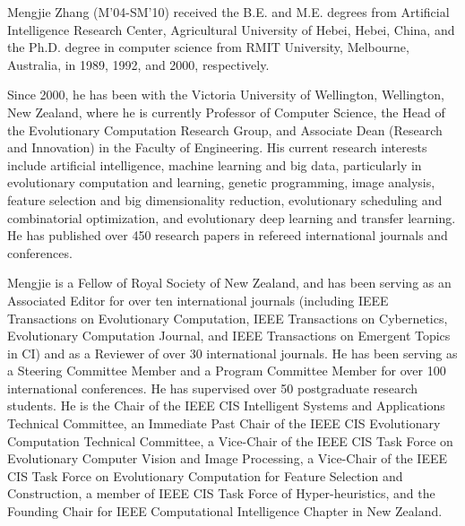 \documentclass[10pt,journal,compsoc]{IEEEtran}
\begin{document}
\vspace{-9.5 mm}
\begin{IEEEbiography}{Mengjie Zhang} (M’04-SM’10)
received the B.E. and M.E. degrees from Artificial Intelligence Research Center, Agricultural University of Hebei, Hebei, China, and the Ph.D. degree in computer science from RMIT University, Melbourne, Australia, in 1989, 1992, and 2000, respectively.

Since 2000, he has been with the Victoria University of Wellington, Wellington, New Zealand, where he is currently Professor of Computer Science, the Head of the Evolutionary Computation Research Group, and Associate Dean (Research and Innovation) in the Faculty of Engineering. His current research interests include artificial intelligence, machine learning and big data, particularly in evolutionary computation and learning, genetic programming, image analysis, feature selection and big dimensionality reduction, evolutionary scheduling and combinatorial optimization, and evolutionary deep learning and transfer learning. He has published over 450 research papers in refereed international journals and conferences.

Mengjie is a Fellow of Royal Society of New Zealand, and has been serving as an Associated Editor for over ten international journals (including IEEE Transactions on Evolutionary Computation, IEEE Transactions on Cybernetics, Evolutionary Computation Journal, and IEEE Transactions on Emergent Topics in CI) and as a Reviewer of over 30 international journals. He has been serving as a Steering Committee Member and a Program Committee Member for over 100 international conferences. He has supervised over 50  postgraduate research students. He is the Chair of the IEEE CIS Intelligent Systems and Applications Technical Committee, an Immediate Past Chair of the IEEE CIS Evolutionary Computation Technical Committee, a Vice-Chair of the IEEE CIS Task Force on Evolutionary Computer Vision and Image Processing, a Vice-Chair of the IEEE CIS  Task Force on Evolutionary Computation for Feature Selection and Construction, a member of IEEE CIS Task Force of Hyper-heuristics, and the Founding Chair for IEEE Computational Intelligence Chapter in New Zealand.
\end{IEEEbiography}
\end{document}
